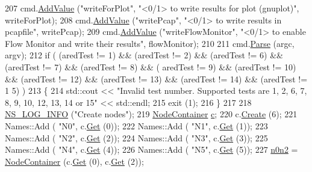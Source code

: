 \begin{DoxyCode}
207   cmd.\hyperlink{classns3_1_1CommandLine_addcfb546c7ad4c8bd0965654d55beb8e}{AddValue} (\textcolor{stringliteral}{"writeForPlot"}, \textcolor{stringliteral}{"<0/1> to write results for plot (gnuplot)"}, writeForPlot);
208   cmd.\hyperlink{classns3_1_1CommandLine_addcfb546c7ad4c8bd0965654d55beb8e}{AddValue} (\textcolor{stringliteral}{"writePcap"}, \textcolor{stringliteral}{"<0/1> to write results in pcapfile"}, writePcap);
209   cmd.\hyperlink{classns3_1_1CommandLine_addcfb546c7ad4c8bd0965654d55beb8e}{AddValue} (\textcolor{stringliteral}{"writeFlowMonitor"}, \textcolor{stringliteral}{"<0/1> to enable Flow Monitor and write their results"}, 
      flowMonitor);
210 
211   cmd.\hyperlink{classns3_1_1CommandLine_a5c10b85b3207e5ecb48d907966923156}{Parse} (argc, argv);
212   \textcolor{keywordflow}{if} ( (aredTest != 1) && (aredTest != 2) && (aredTest != 6) && (aredTest != 7) && (aredTest != 8) && (
      aredTest != 9) && (aredTest != 10) && (aredTest != 12) && (aredTest != 13) && (aredTest != 14) && (aredTest != 1
      5) )
213     \{
214       std::cout << \textcolor{stringliteral}{"Invalid test number. Supported tests are 1, 2, 6, 7, 8, 9, 10, 12, 13, 14 or 15"} << 
      std::endl;
215       exit (1);
216     \}
217 
218   \hyperlink{group__logging_gafbd73ee2cf9f26b319f49086d8e860fb}{NS\_LOG\_INFO} (\textcolor{stringliteral}{"Create nodes"});
219   \hyperlink{classns3_1_1NodeContainer}{NodeContainer} \hyperlink{lte_2model_2fading-traces_2fading__trace__generator_8m_ae0323a9039add2978bf5b49550572c7c}{c};
220   c.\hyperlink{classns3_1_1NodeContainer_a787f059e2813e8b951cc6914d11dfe69}{Create} (6);
221   Names::Add ( \textcolor{stringliteral}{"N0"}, c.\hyperlink{classns3_1_1NodeContainer_a9ed96e2ecc22e0f5a3d4842eb9bf90bf}{Get} (0));
222   Names::Add ( \textcolor{stringliteral}{"N1"}, c.\hyperlink{classns3_1_1NodeContainer_a9ed96e2ecc22e0f5a3d4842eb9bf90bf}{Get} (1));
223   Names::Add ( \textcolor{stringliteral}{"N2"}, c.\hyperlink{classns3_1_1NodeContainer_a9ed96e2ecc22e0f5a3d4842eb9bf90bf}{Get} (2));
224   Names::Add ( \textcolor{stringliteral}{"N3"}, c.\hyperlink{classns3_1_1NodeContainer_a9ed96e2ecc22e0f5a3d4842eb9bf90bf}{Get} (3));
225   Names::Add ( \textcolor{stringliteral}{"N4"}, c.\hyperlink{classns3_1_1NodeContainer_a9ed96e2ecc22e0f5a3d4842eb9bf90bf}{Get} (4));
226   Names::Add ( \textcolor{stringliteral}{"N5"}, c.\hyperlink{classns3_1_1NodeContainer_a9ed96e2ecc22e0f5a3d4842eb9bf90bf}{Get} (5));
227   \hyperlink{adaptive-red-tests_8cc_aeaa87dbd052b50719525adea0f586b36}{n0n2} = \hyperlink{classns3_1_1NodeContainer}{NodeContainer} (c.\hyperlink{classns3_1_1NodeContainer_a9ed96e2ecc22e0f5a3d4842eb9bf90bf}{Get} (0), c.\hyperlink{classns3_1_1NodeContainer_a9ed96e2ecc22e0f5a3d4842eb9bf90bf}{Get} (2));

\end{DoxyCode}
